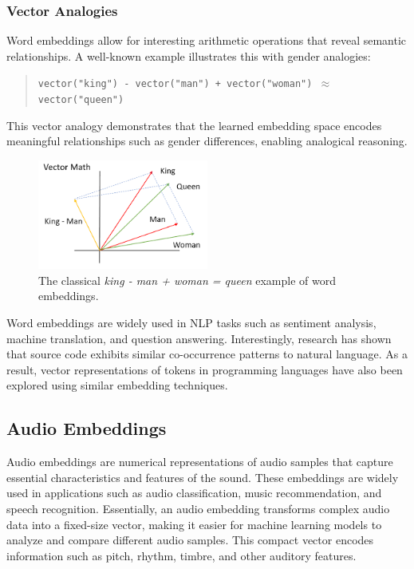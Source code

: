 \subsubsection*{Vector Analogies}

Word embeddings allow for interesting arithmetic operations that reveal semantic relationships. A well-known example illustrates this with gender analogies:

\begin{quote}
\centering
\texttt{vector("king") - vector("man") + vector("woman") $\approx$ vector("queen")}
\end{quote}

This vector analogy demonstrates that the learned embedding space encodes meaningful relationships such as gender differences, enabling analogical reasoning.

\begin{figure}[htbp]
  \centering
  \includegraphics[width=0.5\textwidth]{images/Word Embedding Example.png}
  \caption{The classical \textit{king - man + woman = queen} example of word embeddings.}
  \label{fig:indexing-process-manual}
\end{figure}

Word embeddings are widely used in NLP tasks such as sentiment analysis, machine translation, and question answering. Interestingly, research has shown that source code exhibits similar co-occurrence patterns to natural language. As a result, vector representations of tokens in programming languages have also been explored using similar embedding techniques.

\subsection*{Audio Embeddings}
\label{sssec:audio-embeddings}

Audio embeddings are numerical representations of audio samples that capture essential characteristics and features of the sound. These embeddings are widely used in applications such as audio classification, music recommendation, and speech recognition. Essentially, an audio embedding transforms complex audio data into a fixed-size vector, making it easier for machine learning models to analyze and compare different audio samples. This compact vector encodes information such as pitch, rhythm, timbre, and other auditory features.


